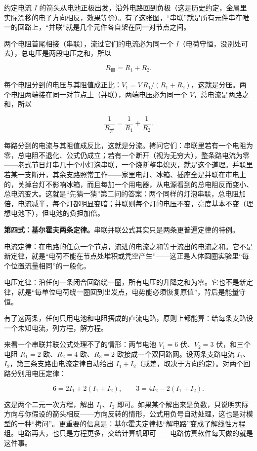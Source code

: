 约定电流 \(I\) 的箭头从电池正极出发，沿外电路回到负极（这是历史约定，金属里实际漂移的电子方向相反，效果等价）。有了这张图，“串联”就是所有元件串在唯一的回路上，“并联”就是几个元件各自架在同一对节点之间。

两个电阻首尾相接（串联），流过它们的电流必为同一个 \(I\)（电荷守恒，没别处可去），总电压是两段电压之和，所以

\[
R_{\text{串}}=R_1+R_2.
\]

每个电阻分到的电压与其阻值成正比：\(V_1=V\,R_1/(R_1+R_2)\)，这就是分压。两个电阻两端接在同一对节点上（并联），两端电压必为同一个 \(V\)，总电流是两路之和，所以

\[
\frac{1}{R_{\text{并}}}=\frac{1}{R_1}+\frac{1}{R_2}.
\]

每路分到的电流与其阻值成反比，这就是分流。拷问它们：串联里若有一个电阻为零，总电阻不退化、公式仍成立；若有一个断开（视为无穷大），整条路电流为零——老式节日灯串几十个小灯泡串联，一个烧断整串熄灭，就是这个道理。并联里若某一支断开，其余支路照常工作——家里电灯、冰箱、插座全是并联在市电上的，关掉台灯不影响冰箱，而且每加一个用电器，从电源看到的总电阻反而变小、总电流变大。这就是“先猜一猜”第二问的答案：两个同样的灯泡串联，总电阻加倍，电流减半，每个灯都明显变暗；并联则每个灯的电压不变，亮度基本不变（理想电池下），但电池的负担加倍。

\textbf{第四式：基尔霍夫两条定律。}串联并联公式其实只是两条更普遍定律的特例。

电流定律：在电路的任意一个节点，流进的电流之和等于流出的电流之和。它不是新定律，就是“电荷不能在节点处堆积或凭空产生”——这正是人体圆圈实验里“每个位置流量相同”的一般化。

电压定律：沿任何一条闭合回路绕一圈，所有电压的升降之和为零。它也不是新定律，就是“每单位电荷绕一圈回到出发点，电势能必须恢复原值”，背后是能量守恒。

有了这两条，任何只用电池和电阻搭成的直流电路，原则上都能算：给每条支路设一个未知电流，列方程，解方程。

\begin{mathbridge}
来看一个串联并联公式处理不了的情形：两节电池 \(V_1=6\) 伏、\(V_2=3\) 伏，和三个电阻 \(R_1=2\) 欧、\(R_2=4\) 欧、\(R_3=2\) 欧接成一个双回路网。设两条支路电流 \(I_1\)、\(I_2\)，第三条支路由电流定律自动给出 \(I_1+I_2\)（或差，取决于方向约定）。对两个回路分别用电压定律：

\[
6=2I_1+2(I_1+I_2),\qquad 3=4I_2-2(I_1+I_2).
\]

这是两个二元一次方程，解出 \(I_1\)、\(I_2\) 即可。如果某个解出来是负数，只说明实际方向与你假设的箭头相反——方向反转的情形，公式用负号自动处理，这也是对模型的一种“拷问”。更重要的信息是：基尔霍夫定律把“解电路”变成了解线性方程组。电路再大，也只是方程更多，交给计算机即可——电路仿真软件每天做的就是这件事。
\end{mathbridge}

